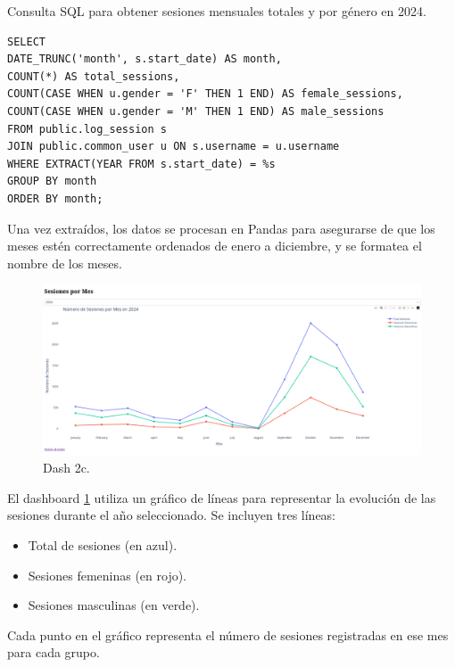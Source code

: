 \documentclass[a4paper, 12pt]{book}
\begin{document}
\begin{listing}[h!]
    \caption{Consulta SQL para obtener sesiones mensuales totales y por género en 2024.}{}
    \label{lst:sql_monthly_sessions_gender_2024}
    \begin{verbatim}
SELECT 
DATE_TRUNC('month', s.start_date) AS month,
COUNT(*) AS total_sessions,
COUNT(CASE WHEN u.gender = 'F' THEN 1 END) AS female_sessions,
COUNT(CASE WHEN u.gender = 'M' THEN 1 END) AS male_sessions
FROM public.log_session s
JOIN public.common_user u ON s.username = u.username
WHERE EXTRACT(YEAR FROM s.start_date) = %s
GROUP BY month
ORDER BY month;
    \end{verbatim}
\end{listing}

Una vez extraídos, los datos se procesan en Pandas para asegurarse de que los meses estén correctamente ordenados de enero a diciembre, y se formatea el nombre de los meses.


\begin{figure}
  \centering
  \includegraphics[width=1.1\textwidth]{img/2c.png}
  \caption{Dash 2c.}\label{fig:2c}
\end{figure}

El dashboard \ref{fig:2c} utiliza un gráfico de líneas para representar la evolución de las sesiones durante el año seleccionado. Se incluyen tres líneas:

\begin{itemize}
  \item Total de sesiones (en azul).
  \item Sesiones femeninas (en rojo).
  \item Sesiones masculinas (en verde).
\end{itemize}


Cada punto en el gráfico representa el número de sesiones registradas en ese mes para cada grupo.
\end{document}
